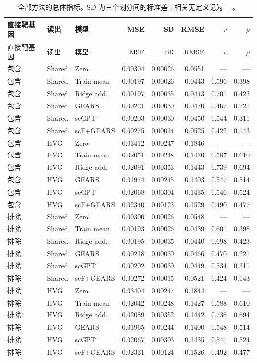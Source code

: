 {\footnotesize\linespread{1}\selectfont\setlength{\tabcolsep}{4pt}\renewcommand{\arraystretch}{1.08}\begin{longtable}{lllrrrrr}\caption{全部方法的总体指标。SD 为三个划分间的标准差；相关无定义记为 ---。}\\\toprule 直接靶基因 & 读出 & 模型 & MSE & SD & RMSE & $r$ & $\rho$\\\midrule\endfirsthead\toprule 直接靶基因 & 读出 & 模型 & MSE & SD & RMSE & $r$ & $\rho$\\\midrule\endhead
包含 & Shared & Zero & 0.00304 & 0.00026 & 0.0551 & --- & ---\\
包含 & Shared & Train mean & 0.00197 & 0.00026 & 0.0443 & 0.596 & 0.398\\
包含 & Shared & Ridge add. & 0.00197 & 0.00035 & 0.0443 & 0.701 & 0.423\\
包含 & Shared & GEARS & 0.00221 & 0.00030 & 0.0470 & 0.467 & 0.221\\
包含 & Shared & scGPT & 0.00203 & 0.00030 & 0.0450 & 0.544 & 0.311\\
包含 & Shared & scF+GEARS & 0.00275 & 0.00014 & 0.0525 & 0.422 & 0.143\\
包含 & HVG & Zero & 0.03412 & 0.00247 & 0.1846 & --- & ---\\
包含 & HVG & Train mean & 0.02051 & 0.00248 & 0.1430 & 0.587 & 0.610\\
包含 & HVG & Ridge add. & 0.02091 & 0.00353 & 0.1443 & 0.739 & 0.694\\
包含 & HVG & GEARS & 0.01974 & 0.00245 & 0.1403 & 0.547 & 0.514\\
包含 & HVG & scGPT & 0.02068 & 0.00304 & 0.1435 & 0.546 & 0.524\\
包含 & HVG & scF+GEARS & 0.02340 & 0.00123 & 0.1529 & 0.490 & 0.477\\
排除 & Shared & Zero & 0.00300 & 0.00026 & 0.0548 & --- & ---\\
排除 & Shared & Train mean & 0.00193 & 0.00026 & 0.0439 & 0.601 & 0.398\\
排除 & Shared & Ridge add. & 0.00195 & 0.00035 & 0.0440 & 0.698 & 0.423\\
排除 & Shared & GEARS & 0.00218 & 0.00030 & 0.0466 & 0.470 & 0.221\\
排除 & Shared & scGPT & 0.00202 & 0.00030 & 0.0449 & 0.534 & 0.311\\
排除 & Shared & scF+GEARS & 0.00272 & 0.00015 & 0.0521 & 0.424 & 0.143\\
排除 & HVG & Zero & 0.03404 & 0.00247 & 0.1844 & --- & ---\\
排除 & HVG & Train mean & 0.02042 & 0.00248 & 0.1427 & 0.588 & 0.610\\
排除 & HVG & Ridge add. & 0.02089 & 0.00352 & 0.1442 & 0.736 & 0.694\\
排除 & HVG & GEARS & 0.01965 & 0.00244 & 0.1400 & 0.548 & 0.514\\
排除 & HVG & scGPT & 0.02067 & 0.00303 & 0.1435 & 0.541 & 0.524\\
排除 & HVG & scF+GEARS & 0.02331 & 0.00124 & 0.1526 & 0.492 & 0.477\\
\bottomrule\end{longtable}}
